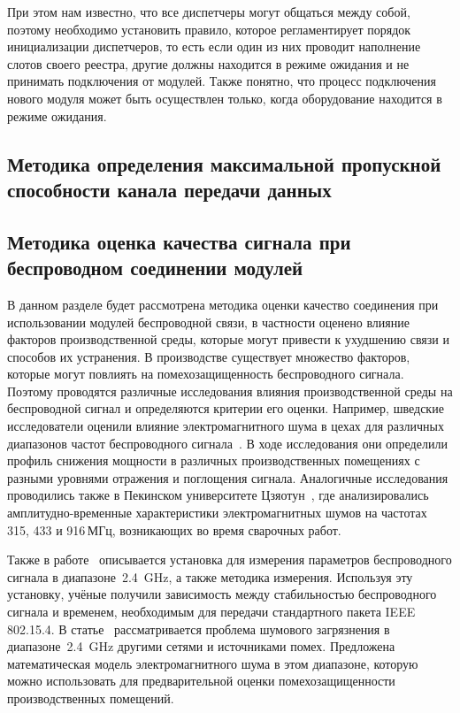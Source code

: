 При этом нам известно, что все диспетчеры могут общаться между собой, поэтому необходимо установить правило, которое регламентирует порядок инициализации диспетчеров, то есть если один из них проводит наполнение слотов своего реестра, другие должны находится в режиме ожидания и не принимать подключения от модулей. Также понятно, что процесс подключения нового модуля может быть осуществлен только, когда оборудование находится в режиме ожидания.

\subsection{Методика определения максимальной пропускной способности канала передачи данных}

\subsection{Методика оценка качества сигнала при беспроводном соединении модулей}

В данном разделе будет рассмотрена методика оценки качество соединения при использовании модулей беспроводной связи, в частности оценено влияние факторов производственной среды, которые могут привести к ухудшению связи и способов их устранения. В производстве существует множество факторов, которые могут повлиять на помехозащищенность беспроводного сигнала. Поэтому проводятся различные исследования влияния производственной среды на беспроводной сигнал и определяются критерии его оценки. Например, шведские исследователи оценили влияние электромагнитного шума в цехах для различных диапазонов частот беспроводного сигнала~\cite{6525614, 5475862}. В ходе исследования они определили профиль снижения мощности в различных производственных помещениях с разными уровнями отражения и поглощения сигнала. Аналогичные исследования проводились также в Пекинском университете Цзяотун~\cite{Li2019}, где анализировались амплитудно-временные характеристики электромагнитных шумов на частотах 315, 433 и 916\,МГц, возникающих во время сварочных работ.
	
Также в работе~\cite{Girs2013DesignOC} описывается установка для измерения параметров беспроводного сигнала в диапазоне~\SI{2,4}{\giga\hertz}, а также методика измерения. Используя эту установку, учёные получили зависимость между стабильностью беспроводного сигнала и временем, необходимым для передачи стандартного пакета IEEE 802.15.4. В статье~\cite{8308609} рассматривается проблема шумового загрязнения в диапазоне~\SI{2,4}{\giga\hertz} другими сетями и источниками помех. Предложена математическая модель электромагнитного шума в этом диапазоне, которую можно использовать для предварительной оценки помехозащищенности производственных помещений.

